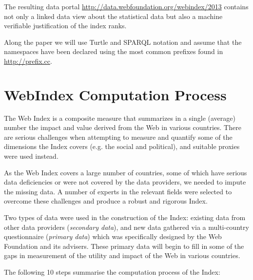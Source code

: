 \documentclass{llncs}
\begin{document}
The resulting data portal \url{http://data.webfoundation.org/webindex/2013} contains not only a linked data view about the statistical data but also a machine verifiable justification of the index ranks.


Along the paper we will use Turtle and SPARQL notation and assume that the
namespaces have been declared using the most common prefixes found in
\url{http://prefix.cc}.

\section{WebIndex Computation Process}

The Web Index is a composite measure that summarizes in a single (average) number the impact and value derived from the Web in various countries. There are serious challenges when attempting to measure and quantify some of the dimensions the Index covers (e.g. the social and political), and suitable proxies were used instead.

As the Web Index covers a large number of countries, some of which have serious data deficiencies or were not covered by the data providers, we needed to impute the missing data. 
A number of experts in the relevant fields were selected to overcome these challenges and 
produce a robust and rigorous Index.

Two types of data were used in the construction of the Index: existing data from other data providers (\emph{secondary data}), and new data gathered via a multi-country questionnaire (\emph{primary data}) 
which was specifically designed by the Web Foundation and its advisers. 
These primary data will begin to fill in some of the gaps in measurement of the utility and impact of the Web in various countries. 

The following 10 steps summarise the computation process of the Index:
\end{document}
